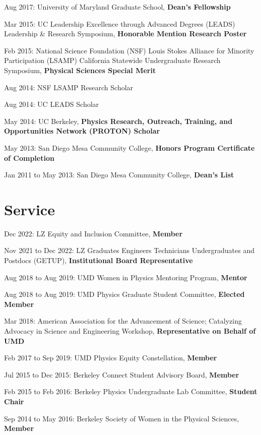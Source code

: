 \documentclass[
]{scrartcl}
\begin{document}
Aug 2017: University of Maryland Graduate School, \textbf{Dean's
Fellowship}

Mar 2015: UC Leadership Excellence through Advanced Degrees (LEADS)
Leadership \& Research Symposium, \textbf{Honorable Mention Research
Poster}

Feb 2015: National Science Foundation (NSF) Louis Stokes Alliance for
Minority Participation (LSAMP) California Statewide Undergraduate
Research Symposium, \textbf{Physical Sciences Special Merit}

Aug 2014: NSF LSAMP Research Scholar

Aug 2014: UC LEADS Scholar

May 2014: UC Berkeley, \textbf{Physics Research, Outreach, Training, and
Opportunities Network (PROTON) Scholar}

May 2013: San Diego Mesa Community College, \textbf{Honors Program
Certificate of Completion}

Jan 2011 to May 2013: San Diego Mesa Community College, \textbf{Dean's
List}

\hypertarget{fa-people-carry-service}{%
\section{\texorpdfstring{
Service}{ Service}}\label{fa-people-carry-service}}

Dec 2022: LZ Equity and Inclusion Committee, \textbf{Member}

Nov 2021 to Dec 2022: LZ Graduates Engineers Technicians Undergraduates
and Postdocs (GETUP), \textbf{Institutional Board Representative}

Aug 2018 to Aug 2019: UMD Women in Physics Mentoring Program,
\textbf{Mentor}

Aug 2018 to Aug 2019: UMD Physics Graduate Student Committee,
\textbf{Elected Member}

Mar 2018: American Association for the Advancement of Science;
Catalyzing Advocacy in Science and Engineering Workshop,
\textbf{Representative on Behalf of UMD}

Feb 2017 to Sep 2019: UMD Physics Equity Constellation, \textbf{Member}

Jul 2015 to Dec 2015: Berkeley Connect Student Advisory Board,
\textbf{Member}

Feb 2015 to Feb 2016: Berkeley Physics Undergraduate Lab Committee,
\textbf{Student Chair}

Sep 2014 to May 2016: Berkeley Society of Women in the Physical
Sciences, \textbf{Member}
\end{document}
